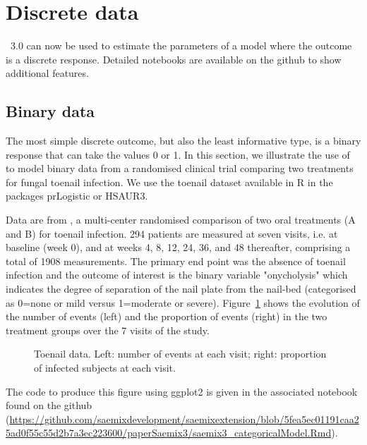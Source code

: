 
\section{Discrete data}

\monolix~3.0 can now be used to estimate the parameters of a model where the outcome is a discrete response. Detailed notebooks are available on the github to show additional features.

\subsection{Binary data} \label{sec:toenail}
 
The most simple discrete outcome, but also the least informative type, is a binary response that can take the values 0 or 1. In this section, we illustrate the use of \monolix to model binary data from a randomised clinical trial comparing two treatments for fungal toenail infection. We use the {\sf toenail} dataset available in {\sf R} in the packages {\sf prLogistic} or {\sf HSAUR3}.

Data are from \cite{debacker_toenail}, a multi-center randomised comparison  of two oral treatments (A and B) for toenail infection. 294 patients are measured at seven visits, i.e. at baseline (week 0), and at weeks 4, 8, 12, 24, 36, and 48 thereafter, comprising a total of 1908 measurements. The primary end point was the absence of toenail infection and the outcome of interest is the binary variable "onycholysis" which indicates the degree of separation of the nail plate from the nail-bed (categorised as 0=none or mild versus 1=moderate or severe). Figure~\ref{fig:toenailData} shows the evolution of the number of events (left) and the proportion of events (right) in the two treatment groups over the 7 visits of the study.

\begin{figure}[!h]
\begin{center}
\end{center}
\par \kern -0.5cm
\caption{Toenail data. Left: number of events at each visit; right: proportion of infected subjects at each visit.} \label{fig:toenailData}
\end{figure}

The code to produce this figure using {\sf ggplot2} is given in the associated notebook found on the github (\url{https://github.com/saemixdevelopment/saemixextension/blob/5fea5ec01191caa25ad0f55c55d2b7a3ec223600/paperSaemix3/saemix3_categoricalModel.Rmd}).

